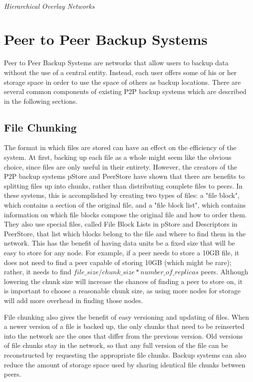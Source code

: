 \documentclass[12pt]{report}
\begin{document}
\hfill \\
\textit{Hierarchical Overlay Networks}
\hfill \\

\section{Peer to Peer Backup Systems}
Peer to Peer Backup Systems are networks that allow users to backup data without the use of a central entity. Instead, each user offers some of his or her storage space in order to use the space of others as backup locations. There are several common components of existing P2P backup systems which are described in the following sections.

\subsection{File Chunking}
\label{sec:filechunking}
The format in which files are stored can have an effect on the efficiency of the system. At first, backing up each file as a whole might seem like the obvious choice, since files are only useful in their entirety. However, the creators of the P2P backup systems pStore and PeerStore have shown that there are benefits to splitting files up into chunks, rather than distributing complete files to peers. In these systems, this is accomplished by creating two types of files: a "file block", which contains a section of the original file, and a "file block list", which contains information on which file blocks compose the original file and how to order them. They also use special files, called File Block Lists in pStore and Descriptors in PeerStore, that list which blocks belong to the file and where to find them in the network. This has the benefit of having data units be a fixed size that will be easy to store for any node. For example, if a peer needs to store a 10GB file, it does not need to find a peer capable of storing 10GB (which might be rare); rather, it needs to find $file\_size/chunk\_size*number\_of\_replicas$ peers. Although lowering the chunk size will increase the chances of finding a peer to store on, it is important to choose a reasonable chunk size, as using more nodes for storage will add more overhead in finding those nodes.

File chunking also gives the benefit of easy versioning and updating of files. When a newer version of a file is backed up, the only chunks that need to be reinserted into the network are the ones that differ from the previous version. Old versions of file chunks stay in the network, so that any full version of the file can be reconstructed by requesting the appropriate file chunks. Backup systems can also reduce the amount of storage space used by sharing identical file chunks between peers.
\end{document}
